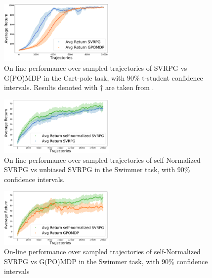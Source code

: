 \documentclass{article}
\theoremstyle{remark}
\theoremstyle{definition}
\begin{document}
\begin{figure}[t]
	\includegraphics[width=0.5\textwidth]{images/cart_pole_SVRPG_vs_GPOMDP}
	\caption{On-line performance over sampled trajectories of SVRPG vs G(PO)MDP in the Cart-pole task, with 90\% t-student confidence intervals. Results denoted with $\dagger$ are taken from \cite{duan2016benchmarking}.}
	\label{fig:cartpole}
\end{figure}

\begin{figure}[t]
	\includegraphics[width=0.5\textwidth]{swimmer_self_normalized_SVRPG_vs_SVRPG}
	\caption{On-line performance over sampled trajectories of self-Normalized SVRPG vs unbiased SVRPG in the Swimmer task, with 90\% confidence intervals.}
	\label{fig:swimmertwo}
\end{figure}

\begin{figure}[t]
	\includegraphics[width=0.5\textwidth]{swimmer_self_normalized_SVRPG_vs_GPOMDP}
	\caption{On-line performance over sampled trajectories of self-Normalized SVRPG vs G(PO)MDP in the Swimmer task, with 90\% confidence intervals}
	\label{fig:swimmerone}
\end{figure}
\end{document}
